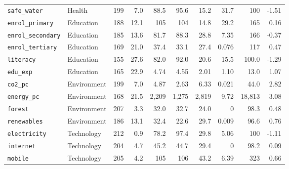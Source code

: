 \begin{tabular}{llrrrrrrrr}
\texttt{safe\_water} & Health & 199 & 7.0 & 88.5 & 95.6 & 15.2 & 31.7 & 100 & -1.51 \\
\texttt{enrol\_primary} & Education & 188 & 12.1 & 105 & 104 & 14.8 & 29.2 & 165 & 0.16 \\
\texttt{enrol\_secondary} & Education & 185 & 13.6 & 81.7 & 88.3 & 28.8 & 7.35 & 166 & -0.37 \\
\texttt{enrol\_tertiary} & Education & 169 & 21.0 & 37.4 & 33.1 & 27.4 & 0.076 & 117 & 0.47 \\
\texttt{literacy} & Education & 155 & 27.6 & 82.0 & 92.0 & 20.6 & 15.5 & 100.0 & -1.29 \\
\texttt{edu\_exp} & Education & 165 & 22.9 & 4.74 & 4.55 & 2.01 & 1.10 & 13.0 & 1.07 \\
\texttt{co2\_pc} & Environment & 199 & 7.0 & 4.87 & 2.63 & 6.33 & 0.021 & 44.0 & 2.82 \\
\texttt{energy\_pc} & Environment & 168 & 21.5 & 2,209 & 1,275 & 2,819 & 9.72 & 18,813 & 3.08 \\
\texttt{forest} & Environment & 207 & 3.3 & 32.0 & 32.7 & 24.0 & 0 & 98.3 & 0.48 \\
\texttt{renewables} & Environment & 186 & 13.1 & 32.4 & 22.6 & 29.7 & 0.009 & 96.6 & 0.76 \\
\texttt{electricity} & Technology & 212 & 0.9 & 78.2 & 97.4 & 29.8 & 5.06 & 100 & -1.11 \\
\texttt{internet} & Technology & 204 & 4.7 & 45.2 & 44.7 & 29.4 & 0 & 98.2 & 0.09 \\
\texttt{mobile} & Technology & 205 & 4.2 & 105 & 106 & 43.2 & 6.39 & 323 & 0.66 \\
\bottomrule
\end{tabular}
